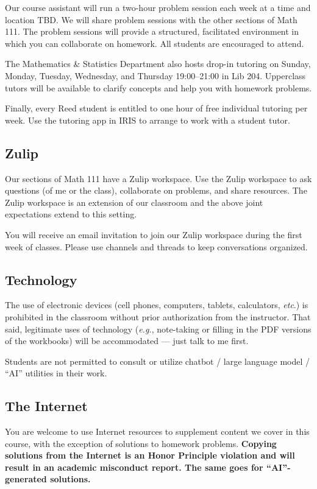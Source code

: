 \documentclass[11pt,twoside]{amsart}
\begin{document}
Our course assistant will run a two-hour problem session each week at a time and location TBD.  We will share problem sessions with the other sections of Math 111.  The problem sessions will provide a structured, facilitated environment in which you can collaborate on homework.  All students are encouraged to attend.

The Mathematics \& Statistics Department also hosts drop-in tutoring on Sunday, Monday, Tuesday, Wednesday, and Thursday 19:00--21:00 in Lib 204. Upperclass tutors will be available to clarify concepts and help you with homework problems.

Finally, every Reed student is entitled to one hour of free individual tutoring per week.  Use the tutoring app in IRIS to arrange to work with a student tutor.

\subsection*{Zulip}
Our sections of Math 111 have a Zulip workspace.  Use the Zulip workspace to ask questions (of me or the class), collaborate on problems, and share resources. The Zulip workspace is an extension of our classroom and the above joint expectations extend to this setting.

You will receive an email invitation to join our Zulip workspace during the first week of classes. Please use channels and threads to keep conversations organized.

\subsection*{Technology}
The use of electronic devices (cell phones, computers, tablets, calculators, \emph{etc}.) is prohibited in the classroom without prior authorization from the instructor.  That said, legitimate uses of technology (\emph{e.g.}, note-taking or filling in the PDF versions of the workbooks) will be accommodated --- 
just talk to me first.

Students are not permitted to consult or utilize chatbot / large language model / ``AI'' utilities in their work.

\subsection*{The Internet}
You are welcome to use Internet resources to supplement content we cover in this course, with the exception of solutions to homework problems.  \textbf{Copying solutions from the Internet is an Honor Principle violation and will result in an academic misconduct report. The same goes for ``AI''-generated solutions.}
\end{document}
